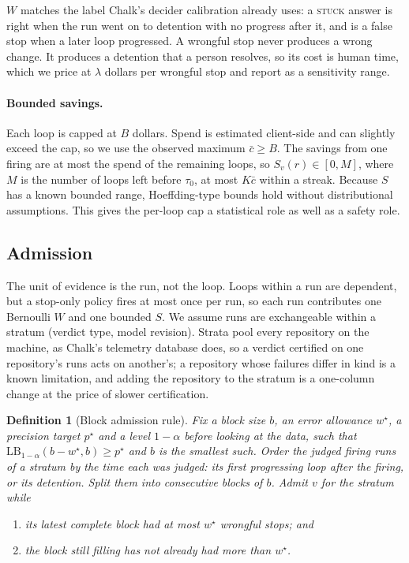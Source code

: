 \documentclass[11pt]{article}
\newtheorem{definition}{Definition}
\theoremstyle{remark}
\newcommand{\LB}{\mathrm{LB}}
\begin{document}
$W$ matches the label Chalk's decider calibration already uses: a \textup{\textsc{stuck}} answer is right when the run went on to detention with no progress after it, and is a false stop when a later loop progressed. A wrongful stop never produces a wrong change. It produces a detention that a person resolves, so its cost is human time, which we price at $\lambda$ dollars per wrongful stop and report as a sensitivity range.

\paragraph{Bounded savings.}
Each loop is capped at $B$ dollars. Spend is estimated client-side and can slightly exceed the cap, so we use the observed maximum $\bar c\ge B$. The savings from one firing are at most the spend of the remaining loops, so $S_v(r)\in[0,M]$, where $M$ is the number of loops left before $\tau_0$, at most $K\bar c$ within a streak. Because $S$ has a known bounded range, Hoeffding-type bounds hold without distributional assumptions. This gives the per-loop cap a statistical role as well as a safety role.

\subsection{Admission}

The unit of evidence is the run, not the loop. Loops within a run are dependent, but a stop-only policy fires at most once per run, so each run contributes one Bernoulli $W$ and one bounded $S$. We assume runs are exchangeable within a stratum (verdict type, model revision). Strata pool every repository on the machine, as Chalk's telemetry database does, so a verdict certified on one repository's runs acts on another's; a repository whose failures differ in kind is a known limitation, and adding the repository to the stratum is a one-column change at the price of slower certification.

\begin{definition}[Block admission rule]
\label{def:admit}
Fix a block size $b$, an error allowance $w^\star$, a precision target $p^\star$ and a level $1-\alpha$ \emph{before} looking at the data, such that $\LB_{1-\alpha}(b-w^\star,b)\ge p^\star$ and $b$ is the smallest such. Order the judged firing runs of a stratum by the time each was judged: its first progressing loop after the firing, or its detention. Split them into consecutive blocks of $b$. Admit $v$ for the stratum while
\begin{enumerate}[leftmargin=*,label=(\roman*)]
\item its latest \emph{complete} block had at most $w^\star$ wrongful stops; and
\item the block still filling has not already had more than $w^\star$.
\end{enumerate}
\end{definition}
\end{document}
